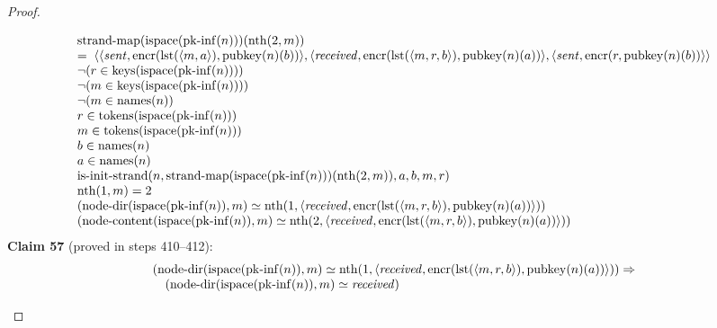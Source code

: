\documentclass[11pt]{article}
\theoremstyle{plain}
\begin{document}
\begin{proof}
\begin{itemize}[leftmargin=2.8em, itemsep=4pt, parsep=1pt]
\begin{itemize}[leftmargin=2.8em, itemsep=4pt, parsep=1pt]
\begin{equation*}
\begin{array}{@{}l@{}}
\begin{array}{@{}l@{}} \operatorname{strand\text{-}map}(\operatorname{ispace}(\operatorname{pk\text{-}inf}(n)))(\operatorname{nth}(2, m)) \\ =\; \langle \langle \mathit{sent}, \operatorname{encr}(\operatorname{lst}(\langle m, a \rangle), \operatorname{pubkey}(n)(b)) \rangle, \langle \mathit{received}, \operatorname{encr}(\operatorname{lst}(\langle m, r, b \rangle), \operatorname{pubkey}(n)(a)) \rangle, \langle \mathit{sent}, \operatorname{encr}(r, \operatorname{pubkey}(n)(b)) \rangle \rangle \end{array} \\
\neg (r \in \operatorname{keys}(\operatorname{ispace}(\operatorname{pk\text{-}inf}(n)))) \\
\neg (m \in \operatorname{keys}(\operatorname{ispace}(\operatorname{pk\text{-}inf}(n)))) \\
\neg (m \in \operatorname{names}(n)) \\
r \in \operatorname{tokens}(\operatorname{ispace}(\operatorname{pk\text{-}inf}(n))) \\
m \in \operatorname{tokens}(\operatorname{ispace}(\operatorname{pk\text{-}inf}(n))) \\
b \in \operatorname{names}(n) \\
a \in \operatorname{names}(n) \\
\operatorname{is\text{-}init\text{-}strand}(n, \operatorname{strand\text{-}map}(\operatorname{ispace}(\operatorname{pk\text{-}inf}(n)))(\operatorname{nth}(2, m)), a, b, m, r) \\
\operatorname{nth}(1, m) = 2 \\
(\operatorname{node\text{-}dir}(\operatorname{ispace}(\operatorname{pk\text{-}inf}(n)), m) \simeq \operatorname{nth}(1, \langle \mathit{received}, \operatorname{encr}(\operatorname{lst}(\langle m, r, b \rangle), \operatorname{pubkey}(n)(a)) \rangle)) \\
(\operatorname{node\text{-}content}(\operatorname{ispace}(\operatorname{pk\text{-}inf}(n)), m) \simeq \operatorname{nth}(2, \langle \mathit{received}, \operatorname{encr}(\operatorname{lst}(\langle m, r, b \rangle), \operatorname{pubkey}(n)(a)) \rangle))
\end{array}
\end{equation*}
\textbf{Claim 57} (proved in steps 410--412):
\begin{equation*}
\begin{array}{@{}l@{}} (\operatorname{node\text{-}dir}(\operatorname{ispace}(\operatorname{pk\text{-}inf}(n)), m) \simeq \operatorname{nth}(1, \langle \mathit{received}, \operatorname{encr}(\operatorname{lst}(\langle m, r, b \rangle), \operatorname{pubkey}(n)(a)) \rangle)) \Rightarrow \\ \quad (\operatorname{node\text{-}dir}(\operatorname{ispace}(\operatorname{pk\text{-}inf}(n)), m) \simeq \mathit{received}) \end{array}
\end{equation*}


\end{itemize}
\end{itemize}
\end{proof}
\end{document}

